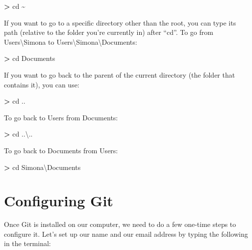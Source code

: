 \documentclass[
]{book}
\newenvironment{Shaded}{\begin{snugshade}}{\end{snugshade}}
\newcommand{\ExtensionTok}[1]{#1}
\newcommand{\NormalTok}[1]{#1}
\newcommand{\OperatorTok}[1]{\textcolor[rgb]{0.81,0.36,0.00}{\textbf{#1}}}
\begin{document}
\begin{Shaded}
\begin{Highlighting}[]
\OperatorTok{\textgreater{}}\NormalTok{ cd }\ExtensionTok{\textasciitilde{}}
\end{Highlighting}
\end{Shaded}

If you want to go to a specific directory other than the root, you can type its path (relative to the folder you're currently in) after ``cd''. To go from Users\textbackslash Simona to Users\textbackslash Simona\textbackslash Documents:

\begin{Shaded}
\begin{Highlighting}[]
\OperatorTok{\textgreater{}}\NormalTok{ cd }\ExtensionTok{Documents}
\end{Highlighting}
\end{Shaded}

If you want to go back to the parent of the current directory (the folder that contains it), you can use:

\begin{Shaded}
\begin{Highlighting}[]
\OperatorTok{\textgreater{}}\NormalTok{ cd }\ExtensionTok{..}
\end{Highlighting}
\end{Shaded}

To go back to Users from Documents:

\begin{Shaded}
\begin{Highlighting}[]
\OperatorTok{\textgreater{}}\NormalTok{ cd }\ExtensionTok{..\textbackslash{}..}
\end{Highlighting}
\end{Shaded}

To go back to Documents from Users:

\begin{Shaded}
\begin{Highlighting}[]
\OperatorTok{\textgreater{}}\NormalTok{ cd }\ExtensionTok{Simona\textbackslash{}Documents}
\end{Highlighting}
\end{Shaded}

\hypertarget{configuring-git}{%
\section{Configuring Git}\label{configuring-git}}

Once Git is installed on our computer, we need to do a few one-time steps to configure it. Let's set up our name and our email address by typing the following in the terminal:
\end{document}

